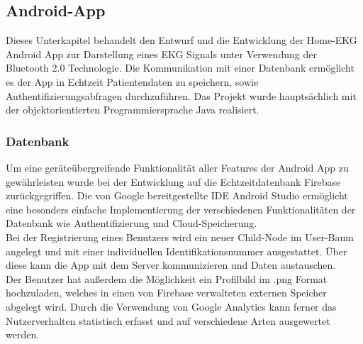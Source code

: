 
\subsection{Android-App}
Dieses Unterkapitel behandelt den Entwurf und die Entwicklung der Home-EKG Android App zur Darstellung eines EKG Signals unter Verwendung der Bluetooth 2.0 Technologie. Die Kommunikation mit einer Datenbank ermöglicht es der App in Echtzeit Patientendaten zu speichern, sowie Authentifizierungsabfragen durchzuführen. Das Projekt wurde hauptsächlich mit der objektorientierten Programmiersprache Java realisiert. 

\subsubsection{Datenbank}
Um eine geräteübergreifende Funktionalität aller Features der Android App zu gewährleisten wurde bei der Entwicklung auf die Echtzeitdatenbank Firebase zurückgegriffen. Die von Google bereitgestellte IDE Android Studio ermöglicht eine besonders einfache Implementierung der verschiedenen Funktionalitäten der Datenbank wie Authentifizierung und Cloud-Speicherung. \\
Bei der Registrierung eines Benutzers wird ein neuer Child-Node im User-Baum angelegt und mit einer individuellen Identifikationsnummer ausgestattet. Über diese kann die App mit dem Server kommunizieren und Daten austauschen. \\
Der Benutzer hat außerdem die Möglichkeit ein Profilbild im .png Format hochzuladen, welches in einen von Firebase verwalteten externen Speicher abgelegt wird. Durch die Verwendung von Google Analytics kann ferner das Nutzerverhalten statistisch erfasst und auf verschiedene Arten ausgewertet werden. 

